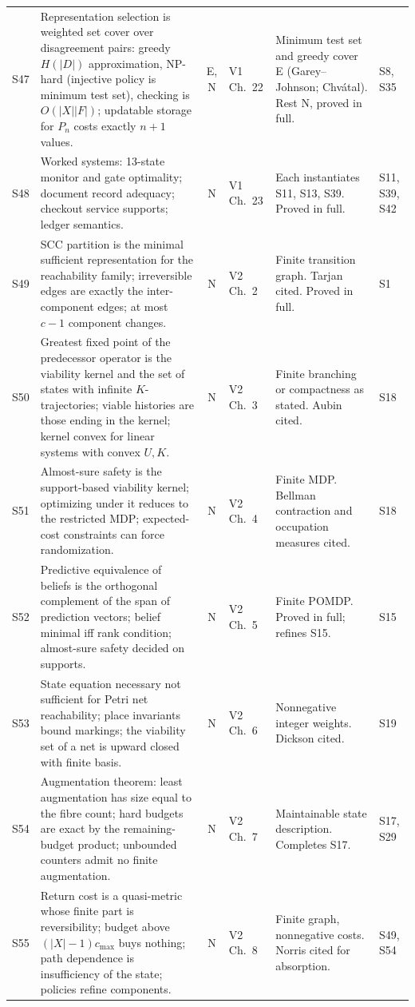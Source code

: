 \documentclass[10pt]{article}
\begin{document}
\begin{longtable}{@{}l p{} c l p{} p{}@{}}
S47 & Representation selection is weighted set cover over disagreement pairs: greedy $H(|D|)$ approximation, NP-hard (injective policy is minimum test set), checking is $O(|X||F|)$; updatable storage for $P_n$ costs exactly $n+1$ values. & E, N & V1 Ch.~22 & Minimum test set and greedy cover E (Garey--Johnson; Chv\'atal). Rest N, proved in full. & S8, S35\\[3pt]
S48 & Worked systems: 13-state monitor and gate optimality; document record adequacy; checkout service supports; ledger semantics. & N & V1 Ch.~23 & Each instantiates S11, S13, S39. Proved in full. & S11, S39, S42\\
S49 & SCC partition is the minimal sufficient representation for the reachability family; irreversible edges are exactly the inter-component edges; at most $c-1$ component changes. & N & V2 Ch.~2 & Finite transition graph. Tarjan cited. Proved in full. & S1\\[3pt]
S50 & Greatest fixed point of the predecessor operator is the viability kernel and the set of states with infinite $K$-trajectories; viable histories are those ending in the kernel; kernel convex for linear systems with convex $U,K$. & N & V2 Ch.~3 & Finite branching or compactness as stated. Aubin cited. & S18\\[3pt]
S51 & Almost-sure safety is the support-based viability kernel; optimizing under it reduces to the restricted MDP; expected-cost constraints can force randomization. & N & V2 Ch.~4 & Finite MDP. Bellman contraction and occupation measures cited. & S18\\[3pt]
S52 & Predictive equivalence of beliefs is the orthogonal complement of the span of prediction vectors; belief minimal iff rank condition; almost-sure safety decided on supports. & N & V2 Ch.~5 & Finite POMDP. Proved in full; refines S15. & S15\\[3pt]
S53 & State equation necessary not sufficient for Petri net reachability; place invariants bound markings; the viability set of a net is upward closed with finite basis. & N & V2 Ch.~6 & Nonnegative integer weights. Dickson cited. & S19\\[3pt]
S54 & Augmentation theorem: least augmentation has size equal to the fibre count; hard budgets are exact by the remaining-budget product; unbounded counters admit no finite augmentation. & N & V2 Ch.~7 & Maintainable state description. Completes S17. & S17, S29\\[3pt]
S55 & Return cost is a quasi-metric whose finite part is reversibility; budget above $(|X|-1)c_{\max}$ buys nothing; path dependence is insufficiency of the state; policies refine components. & N & V2 Ch.~8 & Finite graph, nonnegative costs. Norris cited for absorption. & S49, S54\\[3pt]

\end{longtable}
\end{document}
